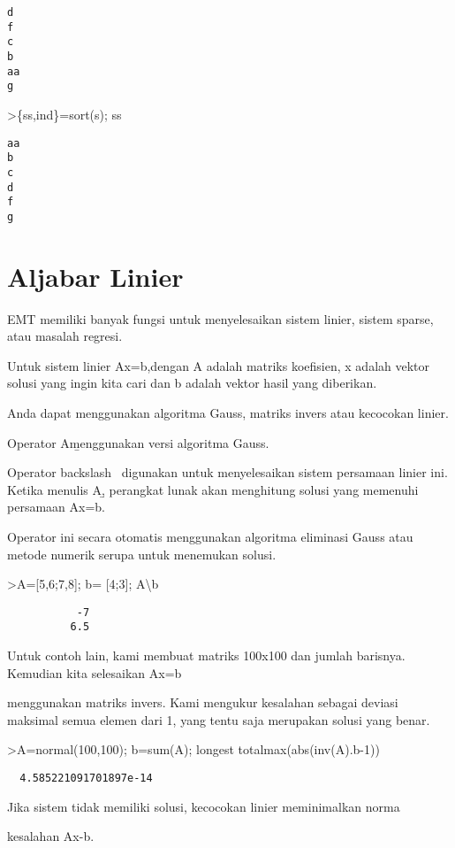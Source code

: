 \documentclass[
]{book}
\begin{document}
\begin{verbatim}
d
f
c
b
aa
g
\end{verbatim}

\textgreater\{ss,ind\}=sort(s); ss

\begin{verbatim}
aa
b
c
d
f
g
\end{verbatim}

\section{Aljabar Linier}\label{aljabar-linier}

EMT memiliki banyak fungsi untuk menyelesaikan sistem linier, sistem sparse, atau masalah regresi.

Untuk sistem linier Ax=b,dengan A adalah matriks koefisien, x adalah vektor solusi yang ingin kita cari dan b adalah vektor hasil yang diberikan.

Anda dapat menggunakan algoritma Gauss, matriks invers atau kecocokan linier.

Operator A\b menggunakan versi algoritma Gauss.

Operator backslash ~digunakan untuk menyelesaikan sistem persamaan linier ini. Ketika menulis A\b, perangkat lunak akan menghitung solusi yang memenuhi persamaan Ax=b.

Operator ini secara otomatis menggunakan algoritma eliminasi Gauss atau metode numerik serupa untuk menemukan solusi.

\textgreater A={[}5,6;7,8{]}; b= {[}4;3{]}; A\textbackslash b

\begin{verbatim}
           -7 
          6.5 
\end{verbatim}

Untuk contoh lain, kami membuat matriks 100x100 dan jumlah barisnya. Kemudian kita selesaikan Ax=b

menggunakan matriks invers. Kami mengukur kesalahan sebagai deviasi maksimal semua elemen dari 1, yang tentu saja merupakan solusi yang benar.

\textgreater A=normal(100,100); b=sum(A); longest totalmax(abs(inv(A).b-1))

\begin{verbatim}
  4.585221091701897e-14 
\end{verbatim}

Jika sistem tidak memiliki solusi, kecocokan linier meminimalkan norma

kesalahan Ax-b.
\end{document}

